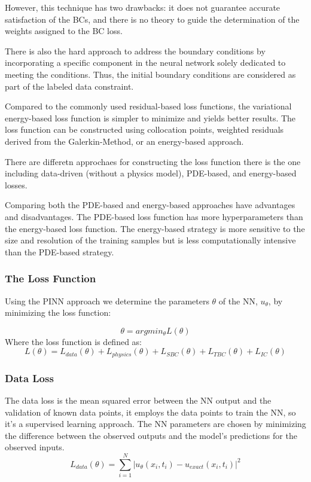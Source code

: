 \documentclass{article}
\begin{document}
However, this technique has two drawbacks: it does not guarantee accurate satisfaction of the BCs, and there is no theory to guide the determination of the weights assigned to the BC loss.

There is also the hard approach to address the boundary conditions by incorporating a specific component in the neural network solely dedicated to meeting the conditions. Thus, the initial boundary conditions are considered as part of the labeled data constraint.

Compared to the commonly used residual-based loss functions, the variational energy-based loss function is simpler to minimize and yields better results. The loss function can be constructed using collocation points, weighted residuals derived from the Galerkin-Method, or an energy-based approach. 

There are differetn approchaes for constructing the loss function there is the one including data-driven (without a physics model), PDE-based, and energy-based losses. 


Comparing both the PDE-based and energy-based approaches have advantages and disadvantages. The PDE-based loss function has more hyperparameters than the energy-based loss function. The energy-based strategy is more sensitive to the size and resolution of the training samples but is less computationally intensive than the PDE-based strategy.


\subsubsection{The Loss Function}

Using the PINN approach we determine the parameters $\theta$ of the NN, $u_\theta$, by minimizing the loss function:

$$
\theta = argmin_\theta L(\theta)
$$
Where the loss function is defined as:
$$
L(\theta) = L_{data}(\theta) + L_{physics}(\theta) + L_{SBC}(\theta) + L_{TBC}(\theta)+ L_{IC}(\theta)
$$

\subsubsection*{Data Loss}

The data loss is the mean squared error between the NN output and the validation of known data points, it employs the data points to train the NN, so it's a supervised learning approach.
The NN parameters are chosen by minimizing the difference between the observed outputs and the model’s predictions for the observed inputs.
$$
L_{data}(\theta) = \sum_{i=1}^{N} |u_\theta(x_i,t_i) - u_{exact}(x_i,t_i)|^2
$$
\end{document}
